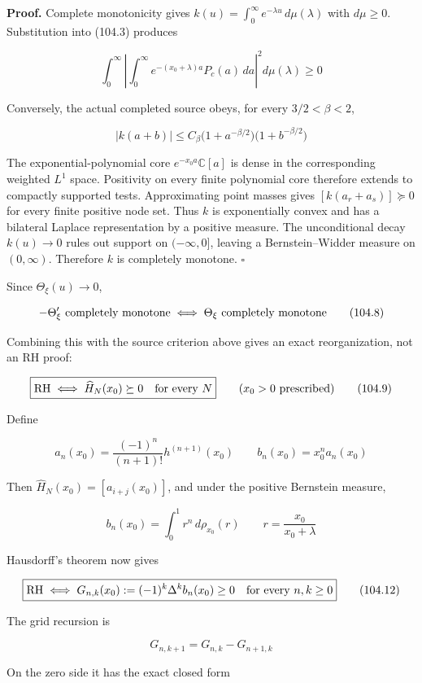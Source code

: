 \documentclass[
  11pt,
]{book}
\begin{document}
\textbf{Proof.} Complete monotonicity gives
\(k(u)=\int_0^\infty e^{-\lambda u}\,d\mu(\lambda)\) with \(d\mu\ge0\).
Substitution into (104.3) produces

\[
\int_0^\infty
\left|
\int_0^\infty e^{-(x_0+\lambda)a}P_c(a)\,da
\right|^2d\mu(\lambda)\ge0
\tag{104.6}
\]

Conversely, the actual completed source obeys, for every
\(3/2<\beta<2\),

\[
|k(a+b)|
\le C_\beta
\bigl(1+a^{-\beta/2}\bigr)
\bigl(1+b^{-\beta/2}\bigr)
\tag{104.7}
\]

The exponential-polynomial core \(e^{-x_0a}\mathbb C[a]\) is dense in
the corresponding weighted \(L^1\) space. Positivity on every finite
polynomial core therefore extends to compactly supported tests.
Approximating point masses gives \([k(a_r+a_s)]\succeq0\) for every
finite positive node set. Thus \(k\) is exponentially convex and has a
bilateral Laplace representation by a positive measure. The
unconditional decay \(k(u)\to0\) rules out support on \((-\infty,0]\),
leaving a Bernstein--Widder measure on \((0,\infty)\). Therefore \(k\)
is completely monotone. \(\square\)

Since \(\Theta_\xi(u)\to0\),

\[
-\Theta_\xi'\hbox{ completely monotone}
\iff
\Theta_\xi\hbox{ completely monotone}
\tag{104.8}
\]

Combining this with the source criterion above gives an exact
reorganization, not an RH proof:

\[
\boxed{
\mathrm{RH}
\iff
\widehat H_N(x_0)\succeq0\quad\hbox{for every }N
}
\qquad(x_0>0\hbox{ prescribed})
\tag{104.9}
\]

Define

\[
a_n(x_0)
=\frac{(-1)^n}{(n+1)!}h^{(n+1)}(x_0)
\qquad
b_n(x_0)=x_0^na_n(x_0)
\tag{104.10}
\]

Then \(\widehat H_N(x_0)=[a_{i+j}(x_0)]\), and under the positive
Bernstein measure,

\[
b_n(x_0)=\int_0^1r^n\,d\rho_{x_0}(r)
\qquad
r=\frac{x_0}{x_0+\lambda}
\tag{104.11}
\]

Hausdorff's theorem now gives

\[
\boxed{
\mathrm{RH}
\iff
G_{n,k}(x_0):=(-1)^k\Delta^kb_n(x_0)\ge0
\quad\hbox{for every }n,k\ge0
}
\tag{104.12}
\]

The grid recursion is

\[
G_{n,k+1}=G_{n,k}-G_{n+1,k}
\tag{104.13}
\]

On the zero side it has the exact closed form
\end{document}
